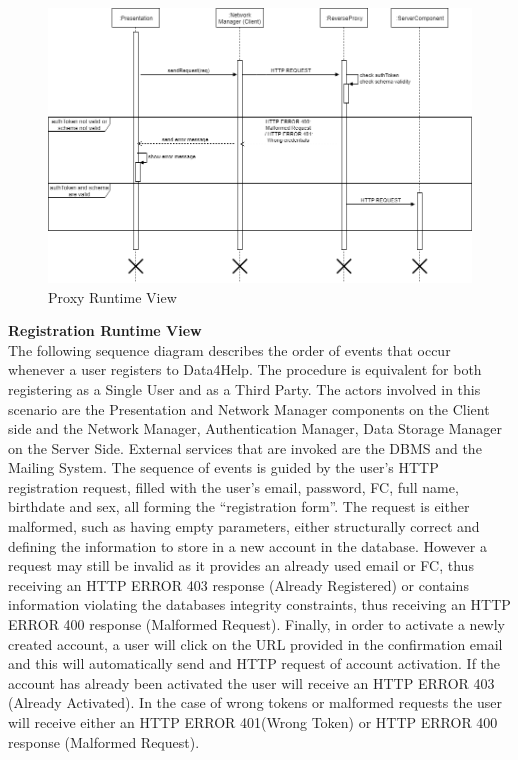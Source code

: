 \documentclass[titlepage]{article}
\begin{document}
\begin{figure}[H]
	\center
  	\includegraphics[width=13cm]{Proxy.png}
  	\caption{Proxy Runtime View}
 	\label{fig:PROXY}
\end{figure}
{\bf Registration Runtime View }\\ 
The following sequence diagram describes the order of events that occur whenever a user registers to Data4Help. The procedure is equivalent for both registering as a Single User and as a Third Party. The actors involved in this scenario are the Presentation and Network Manager components on the Client side and the Network Manager, Authentication Manager, Data Storage Manager on the Server Side. External services that are invoked are the DBMS and the Mailing System.
The sequence of events is guided by the user’s HTTP registration request, filled with the user’s email, password, FC, full name, birthdate and sex, all forming the “registration form”. The request is either malformed, such as having empty parameters, either structurally correct and defining the information to store in a new account in the database. However a request may still be invalid as it provides an already used email or FC, thus receiving an HTTP ERROR 403 response (Already Registered) or contains information violating the databases integrity constraints, thus receiving an HTTP ERROR 400 response (Malformed Request).
Finally, in order to activate a newly created account, a user will click on the URL provided in the confirmation email and this will automatically send and HTTP request of account activation. If the account has already been activated the user will receive an HTTP ERROR 403 (Already Activated). In the case of wrong tokens or malformed requests the user will receive either an HTTP ERROR 401(Wrong Token) or HTTP ERROR 400 response (Malformed Request).
\end{document}
